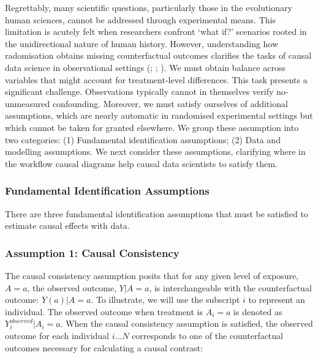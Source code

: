 \documentclass[
  singlecolumn,
  9pt]{article}
\begin{document}
Regrettably, many scientific questions, particularly those in the
evolutionary human sciences, cannot be addressed through experimental
means. This limitation is acutely felt when researchers confront `what
if?' scenarios rooted in the unidirectional nature of human history.
However, understanding how radomisation obtains missing counterfactual
outcomes clarifies the tasks of causal data science in observational
settings (;
;
). We must obtain
balance across variables that might account for treatment-level
differences. This task presents a significant challenge. Observations
typically cannot in themselves verify no-unmeasured confounding.
Moreover, we must satisfy ourselves of additional assumptions, which are
nearly automatic in randomised experimental settings but which cannot be
taken for granted elsewhere. We group these assumption into two
categories: (1) Fundamental identification assumptions; (2) Data and
modelling assumptions. We next consider these assumptions, clarifying
where in the workflow causal diagrams help causal data scientists to
satisfy them.

\subsubsection{Fundamental Identification
Assumptions}\label{fundamental-identification-assumptions}

There are three fundamental identification assumptions that must be
satisfied to estimate causal effects with data.

\subsubsection{Assumption 1: Causal
Consistency}\label{assumption-1-causal-consistency}

The causal consistency assumption posits that for any given level of
exposure, \(A=a\), the observed outcome, \(Y|A=a\), is interchangeable
with the counterfactual outcome: \(Y(a)|A = a\). To illustrate, we will
use the subscript \(i\) to represent an individual. The observed outcome
when treatment is \(A_i = a\) is denoted as \(Y_i^{observed}|A_i = a\).
When the causal consistency assumption is satisfied, the observed
outcome for each individual \(i...N\) corresponds to one of the
counterfactual outcomes necessary for calculating a causal contrast:
\end{document}
